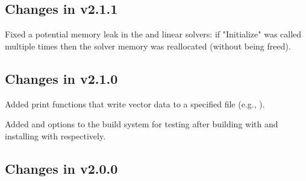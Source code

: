 \subsection*{Changes in v2.1.1}

Fixed a potential memory leak in the {\spgmr} and {\spfgmr} linear
solvers: if "Initialize" was called multiple times then the solver
memory was reallocated (without being freed).

\subsection*{Changes in v2.1.0}

Added {\nvector} print functions that write vector data to a specified
file (e.g., ).

Added  and  options to the build
system for testing {\sundials} after building with  and
installing with  respectively.

\subsection*{Changes in v2.0.0}

